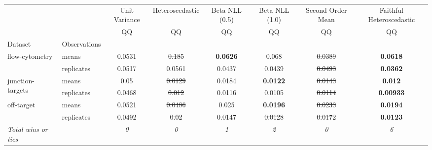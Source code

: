 \begin{tabular}{ll|c|c|c|c|c|c}
\toprule
{} & {} & {Unit Variance} & {Heteroscedastic} & {Beta NLL (0.5)} & {Beta NLL (1.0)} & {Second Order Mean} & {Faithful Heteroscedastic} \\
{} & {} & {QQ} & {QQ} & {QQ} & {QQ} & {QQ} & {QQ} \\
{Dataset} & {Observations} & {} & {} & {} & {} & {} & {} \\
\midrule
\multirow[t]{2}{*}{flow-cytometry} & means & 0.0531 & \sout{0.185} & \textbf{0.0626} & 0.068 & \sout{0.0389} & \textbf{0.0618} \\
 & replicates & 0.0517 & 0.0561 & 0.0437 & 0.0439 & \sout{0.0493} & \textbf{0.0362} \\
\multirow[t]{2}{*}{junction-targets} & means & 0.05 & \sout{0.0129} & 0.0184 & \textbf{0.0122} & \sout{0.0143} & \textbf{0.012} \\
 & replicates & 0.0468 & \sout{0.012} & 0.0116 & 0.0105 & \sout{0.0114} & \textbf{0.00933} \\
\multirow[t]{2}{*}{off-target} & means & 0.0521 & \sout{0.0486} & 0.025 & \textbf{0.0196} & \sout{0.0233} & \textbf{0.0194} \\
 & replicates & 0.0492 & \sout{0.02} & 0.0147 & \sout{0.0128} & \sout{0.0172} & \textbf{0.0123} \\
\textit{{Total wins or ties}} &  & \textit{0} & \textit{0} & \textit{1} & \textit{2} & \textit{0} & \textit{6} \\
\bottomrule
\end{tabular}
